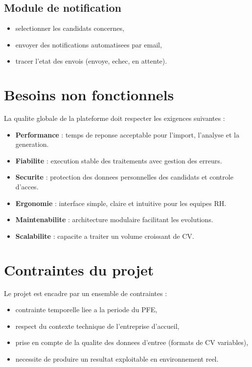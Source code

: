 \subsection{Module de notification}
\begin{itemize}
    \item selectionner les candidats concernes,
    \item envoyer des notifications automatisees par email,
    \item tracer l'etat des envois (envoye, echec, en attente).
\end{itemize}

\section{Besoins non fonctionnels}
La qualite globale de la plateforme doit respecter les exigences suivantes :
\begin{itemize}
    \item \textbf{Performance} : temps de reponse acceptable pour l'import, l'analyse et la generation.
    \item \textbf{Fiabilite} : execution stable des traitements avec gestion des erreurs.
    \item \textbf{Securite} : protection des donnees personnelles des candidats et controle d'acces.
    \item \textbf{Ergonomie} : interface simple, claire et intuitive pour les equipes RH.
    \item \textbf{Maintenabilite} : architecture modulaire facilitant les evolutions.
    \item \textbf{Scalabilite} : capacite a traiter un volume croissant de CV.
\end{itemize}

\section{Contraintes du projet}
Le projet est encadre par un ensemble de contraintes :
\begin{itemize}
    \item contrainte temporelle liee a la periode du PFE,
    \item respect du contexte technique de l'entreprise d'accueil,
    \item prise en compte de la qualite des donnees d'entree (formats de CV variables),
    \item necessite de produire un resultat exploitable en environnement reel.
\end{itemize}

